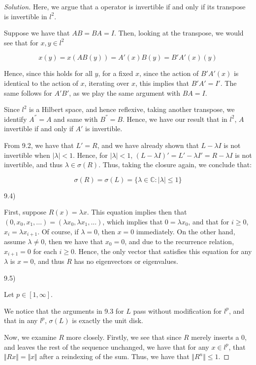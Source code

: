 \documentclass[10pt]{article}
\begin{document}
\begin{proof}[Solution]
Here, we argue that a operator is invertible if and only if its transpose is invertible in $l^2$.

Suppose we have that $AB = BA = I$. Then, looking at the transpose, we would see that for $x, y \in l^2$

$$x(y) =  x (AB(y)) = A'(x) B(y)  = B'A'(x) (y)$$

Hence, since this holds for all $y$, for a fixed $x$, since the action of $B'A'(x)$ is identical to the action of $x$, iterating over $x$, this implies that $B' A' = I'$. The same follows for $A'B'$, as we play the same argument with $BA = I$.

Since $l^2$ is a Hilbert space, and hence reflexive, taking another transpose, we identify $A^{ ''} = A$ and same with $B^{''} = B$. Hence, we have our result that in $l^2$, $A$ invertible if and only if $A'$ is invertible.

From 9.2, we have that $L' = R$, and we have already shown that $L - \lambda I$ is not invertible when $| \lambda| < 1$. Hence, for $| \lambda| < 1$, $(L - \lambda I )' = L' - \lambda I' = R - \lambda I$ is not invertible, and thus $\lambda \in \sigma(R)$. Thus, taking the closure again, we conclude that:

$$\sigma(R) = \sigma(L) =  \{ \lambda \in \mathbb{C} : |\lambda | \leq 1 \}$$


9.4)

First, suppose $R(x) =\lambda x$. This equation implies then that $(0,x_0,x_1,...) = (\lambda x_0, \lambda x_1,...)$, which implies that $0 =\lambda  x_0$, and that for $ i \geq 0$, $x_i = \lambda x_{i+1}$. Of course, if $\lambda = 0$, then $x = 0$ immediately. On the other hand, assume $\lambda \not = 0$, then we have that $x_0 = 0$, and due to the recurrence relation, $x_{i+1} = 0$ for each $i \geq 0$. Hence, the only vector that satisfies this equation for any $\lambda$ is $x = 0$, and thus $R$ has no eigenvectors or eigenvalues.

9.5)

Let $p \in [1, \infty]$.

We notice that the arguments in 9.3 for $L$ pass without modification for $l^p$, and that in any $l^p$, $\sigma(L)$ is exactly the unit disk.

Now, we examine $R$ more closely. Firstly, we see that since $R$ merely inserts a $0$, and leaves the rest of the sequence unchanged, we have that for any $x \in l^p$, that $\Vert Rx \Vert = \Vert x \Vert$ after a reindexing of the sum. Thus, we have that $\Vert R^n \Vert \leq 1$.


\end{proof}
\end{document}
